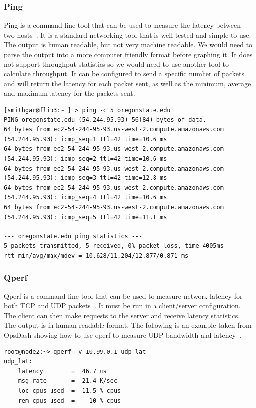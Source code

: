 \documentclass[10pt,letterpaper,onecolumn,journal]{IEEEtran}
\begin{document}
\subsubsection{Ping}
Ping is a command line tool that can be used to measure the latency between two hosts~\cite{ping}.
It is a standard networking tool that is well tested and simple to use.
The output is human readable, but not very machine readable. 
We would need to parse the output into a more computer friendly format before graphing it.
It does not support throughput statistics so we would need to use another tool to calculate throughput.
It can be configured to send a specific number of packets and will return the latency for each packet sent, as well as the minimum, average and maximum latency for the packets sent.
\begin{lstlisting}[caption = Example ping usage, basicstyle=\ttfamily]
[smithgar@flip3:~ ] > ping -c 5 oregonstate.edu
PING oregonstate.edu (54.244.95.93) 56(84) bytes of data.
64 bytes from ec2-54-244-95-93.us-west-2.compute.amazonaws.com (54.244.95.93): icmp_seq=1 ttl=42 time=10.6 ms
64 bytes from ec2-54-244-95-93.us-west-2.compute.amazonaws.com (54.244.95.93): icmp_seq=2 ttl=42 time=10.6 ms
64 bytes from ec2-54-244-95-93.us-west-2.compute.amazonaws.com (54.244.95.93): icmp_seq=3 ttl=42 time=12.8 ms
64 bytes from ec2-54-244-95-93.us-west-2.compute.amazonaws.com (54.244.95.93): icmp_seq=4 ttl=42 time=10.6 ms
64 bytes from ec2-54-244-95-93.us-west-2.compute.amazonaws.com (54.244.95.93): icmp_seq=5 ttl=42 time=11.1 ms

--- oregonstate.edu ping statistics ---
5 packets transmitted, 5 received, 0% packet loss, time 4005ms
rtt min/avg/max/mdev = 10.628/11.204/12.877/0.871 ms
\end{lstlisting}

\subsubsection{Qperf}
Qperf is a command line tool that can be used to measure network latency for both TCP and UDP packets~\cite{qperf}.
It must be run in a client/server configuration.
The client can then make requests to the server and receive latency statistics.
The output is in human readable format.
The following is an example taken from OpsDash showing how to use qperf to measure UDP bandwidth and latency~\cite{qperf-example}.
\begin{lstlisting}[caption = Using qperf to measure UDP latency,basicstyle=\ttfamily]
root@node2:~> qperf -v 10.99.0.1 udp_lat
udp_lat:
    latency        =  46.7 us
    msg_rate       =  21.4 K/sec
    loc_cpus_used  =  11.5 % cpus
    rem_cpus_used  =    10 % cpus
\end{lstlisting}
\end{document}
